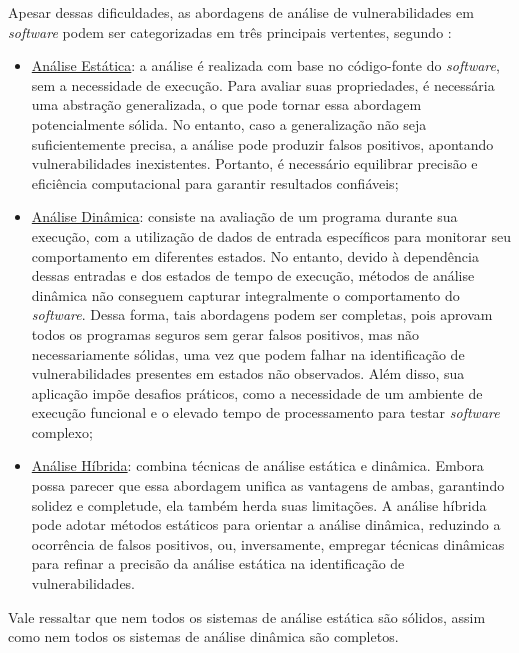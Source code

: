         Apesar dessas dificuldades, as abordagens de análise de vulnerabilidades em \textit{software} podem ser categorizadas em três principais vertentes, segundo :

        \begin{itemize}
            \item \underline{Análise Estática}: a análise é realizada com base no código-fonte do \textit{software}, sem a necessidade de execução. Para avaliar suas propriedades, é necessária uma abstração generalizada, o que pode tornar essa abordagem potencialmente sólida. No entanto, caso a generalização não seja suficientemente precisa, a análise pode produzir falsos positivos, apontando vulnerabilidades inexistentes. Portanto, é necessário equilibrar precisão e eficiência computacional para garantir resultados confiáveis;
            \item \underline{Análise Dinâmica}: consiste na avaliação de um programa durante sua execução, com a utilização de dados de entrada específicos para monitorar seu comportamento em diferentes estados. No entanto, devido à dependência dessas entradas e dos estados de tempo de execução, métodos de  análise dinâmica não conseguem capturar integralmente o comportamento do \textit{software}. Dessa forma, tais abordagens podem ser completas, pois aprovam todos os programas seguros sem gerar falsos positivos, mas não necessariamente sólidas, uma vez que podem falhar na identificação de vulnerabilidades presentes em estados não observados. Além disso, sua aplicação impõe desafios práticos, como a necessidade de um ambiente de execução funcional e o elevado tempo de processamento para testar \textit{software} complexo;
            \item \underline{Análise Híbrida}: combina técnicas de análise estática e dinâmica. Embora possa parecer que essa abordagem unifica as vantagens de ambas, garantindo solidez e completude, ela também herda suas limitações. A análise híbrida pode adotar métodos estáticos para orientar a análise dinâmica, reduzindo a ocorrência de falsos positivos, ou, inversamente, empregar técnicas dinâmicas para refinar a precisão da análise estática na identificação de vulnerabilidades.
        \end{itemize}
        
        Vale ressaltar que nem todos os sistemas de  análise estática são sólidos, assim como nem todos os sistemas de  análise dinâmica são completos.


